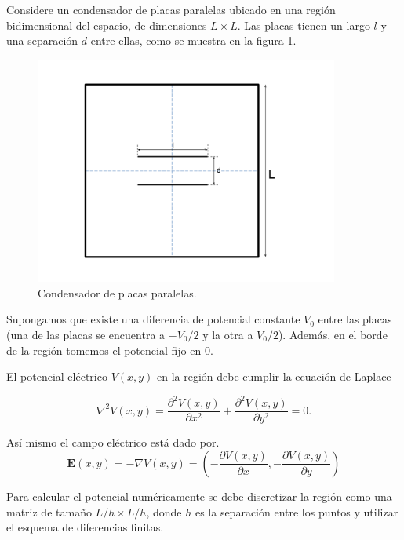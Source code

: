 \documentclass[11pt,letterpaper]{exam}
\begin{document}
\vspace{0.3cm}

\begin{questions}

Considere un condensador de placas paralelas ubicado en una regi\'on
bidimensional del espacio, de dimensiones $L\times L$. Las placas
tienen un largo $l$ y una separaci\'on $d$ entre ellas, como se
muestra en la figura \ref{fig:gridplates}. 

\begin{figure}[H]
  \centering
  \includegraphics[width=10cm]{gridplates}
  \caption{\label{fig:gridplates} Condensador de placas paralelas.}
\end{figure}

Supongamos que existe una diferencia de potencial constante $V_0$
entre las placas (una de las placas se encuentra a $-V_0/2$ y la otra
a $V_0/2$). Adem\'as, en el borde de la regi\'on tomemos el potencial
fijo en $0$. 

El potencial el\'ectrico $V(x,y)$ en la regi\'on debe cumplir la
ecuaci\'on de Laplace 

\begin{equation*}
 \nabla^2V(x,y) = \frac{\partial^2 V(x,y)}{\partial x^2} +
 \frac{\partial^2 V(x,y)}{\partial y^2}=0. 
\end{equation*}

As\'i mismo el campo el\'ectrico est\'a dado por.
\begin{equation*}
\mathbf{E}(x,y) = -\nabla V(x,y) = \left(-\frac{\partial V(x,y)}{\partial x}, -\frac{\partial V(x,y)}{\partial y}\right)
\end{equation*}

Para calcular el potencial num\'ericamente se debe discretizar la
regi\'on como una matriz de tama\~no $L/h \times L/h$, donde $h$ es la
separaci\'on entre los puntos y utilizar el esquema de diferencias
finitas. 


\end{questions}
\end{document}
